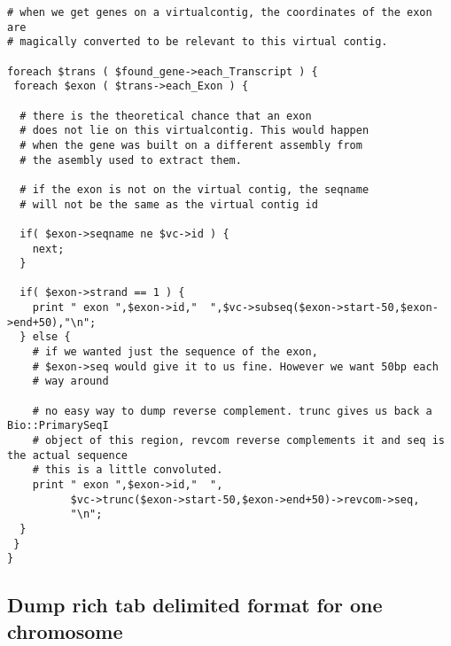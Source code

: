 \documentclass[11pt,a4paper]{article}
\begin{document}
\begin{verbatim}
# when we get genes on a virtualcontig, the coordinates of the exon are
# magically converted to be relevant to this virtual contig.

foreach $trans ( $found_gene->each_Transcript ) {
 foreach $exon ( $trans->each_Exon ) {

  # there is the theoretical chance that an exon
  # does not lie on this virtualcontig. This would happen
  # when the gene was built on a different assembly from
  # the asembly used to extract them.

  # if the exon is not on the virtual contig, the seqname
  # will not be the same as the virtual contig id

  if( $exon->seqname ne $vc->id ) {
    next;
  }

  if( $exon->strand == 1 ) {
    print " exon ",$exon->id,"  ",$vc->subseq($exon->start-50,$exon->end+50),"\n";
  } else {
    # if we wanted just the sequence of the exon, 
    # $exon->seq would give it to us fine. However we want 50bp each
    # way around

    # no easy way to dump reverse complement. trunc gives us back a Bio::PrimarySeqI
    # object of this region, revcom reverse complements it and seq is the actual sequence
    # this is a little convoluted. 
    print " exon ",$exon->id,"  ",
          $vc->trunc($exon->start-50,$exon->end+50)->revcom->seq,
          "\n";
  }
 }
}

\end{verbatim}

\subsection{Dump rich tab delimited format for one chromosome}
\end{document}
